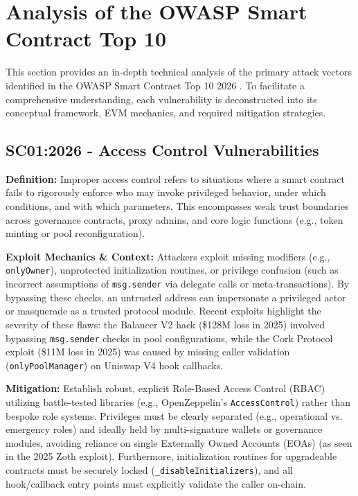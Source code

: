 \section{Analysis of the OWASP Smart Contract Top 10}

This section provides an in-depth technical analysis of the primary attack vectors identified in the OWASP Smart Contract Top 10 2026 \cite{owasp_top10}. To facilitate a comprehensive understanding, each vulnerability is deconstructed into its conceptual framework, EVM mechanics, and required mitigation strategies.

\subsection{SC01:2026 - Access Control Vulnerabilities}
\textbf{Definition:} Improper access control refers to situations where a smart contract fails to rigorously enforce who may invoke privileged behavior, under which conditions, and with which parameters. This encompasses weak trust boundaries across governance contracts, proxy admins, and core logic functions (e.g., token minting or pool reconfiguration).

\textbf{Exploit Mechanics \& Context:} Attackers exploit missing modifiers (e.g., \texttt{onlyOwner}), unprotected initialization routines, or privilege confusion (such as incorrect assumptions of \texttt{msg.sender} via delegate calls or meta-transactions). By bypassing these checks, an untrusted address can impersonate a privileged actor or masquerade as a trusted protocol module. Recent exploits highlight the severity of these flaws: the Balancer V2 hack (\$128M loss in 2025) involved bypassing \texttt{msg.sender} checks in pool configurations, while the Cork Protocol exploit (\$11M loss in 2025) was caused by missing caller validation (\texttt{onlyPoolManager}) on Uniswap V4 hook callbacks.

\textbf{Mitigation:} Establish robust, explicit Role-Based Access Control (RBAC) utilizing battle-tested libraries (e.g., OpenZeppelin's \texttt{AccessControl}) rather than bespoke role systems. Privileges must be clearly separated (e.g., operational vs. emergency roles) and ideally held by multi-signature wallets or governance modules, avoiding reliance on single Externally Owned Accounts (EOAs) (as seen in the 2025 Zoth exploit). Furthermore, initialization routines for upgradeable contracts must be securely locked (\texttt{\_disableInitializers}), and all hook/callback entry points must explicitly validate the caller on-chain.

